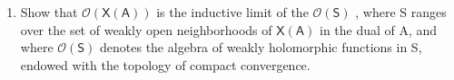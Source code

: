 \begin{enumerate}
\def\labelenumi{\alph{enumi})}
\setcounter{enumi}{4}
\tightlist
\item
  Show that \(\mathcal{O}(\mathsf{X}(\mathsf{A}))\) is the inductive limit of the \(\mathcal{O}(\mathsf{S})\) , where S ranges over the set of weakly open neighborhoods of \(\mathsf{X}(\mathsf{A})\) in the dual of A, and where \(\mathcal{O}(\mathsf{S})\) denotes the algebra of weakly holomorphic functions in S, endowed with the topology of compact convergence.
\end{enumerate}

